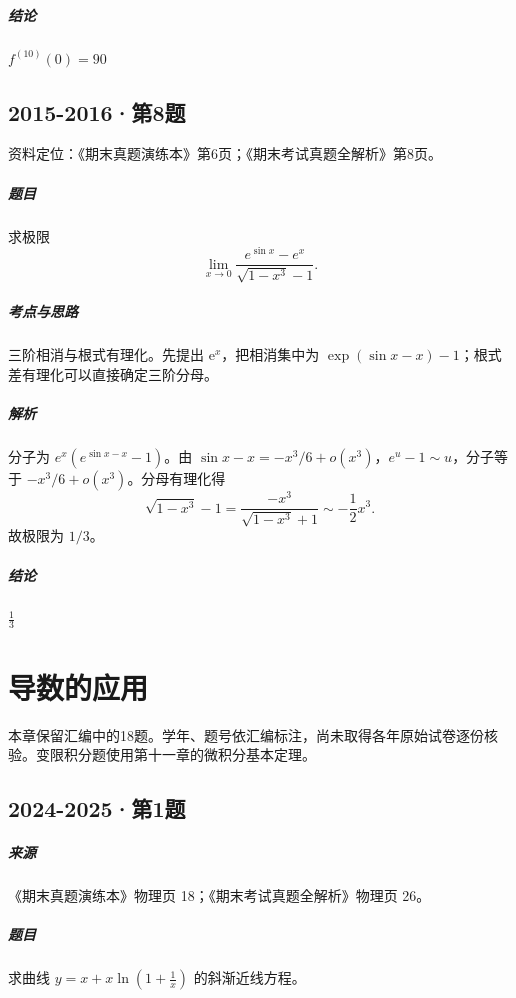 \documentclass[UTF8,fontset=fandol,12pt,oneside,openany]{ctexrep}
\newcommand{\ee}{\mathrm e}
\theoremstyle{definition}
\begin{document}
\paragraph{结论}
$f^{(10)}(0)=90$

\par\addvspace{18pt}\noindent\begin{minipage}{\linewidth}
\section{2015-2016·第8题}
\label{exam:08:q22}
资料定位：《期末真题演练本》第6页；《期末考试真题全解析》第8页。
\paragraph{题目}
求极限 \[\lim_{x\to0}\frac{e^{\sin x}-e^x}{\sqrt{1-x^3}-1}.\]
\end{minipage}\par
\paragraph{考点与思路}
三阶相消与根式有理化。先提出 $\ee^x$，把相消集中为 $\exp(\sin x-x)-1$；根式差有理化可以直接确定三阶分母。
\paragraph{解析}
分子为 $e^x(e^{\sin x-x}-1)$。由 $\sin x-x=-x^3/6+o(x^3)$，$e^u-1\sim u$，分子等于 $-x^3/6+o(x^3)$。分母有理化得 \[\sqrt{1-x^3}-1=\frac{-x^3}{\sqrt{1-x^3}+1}\sim-\frac12x^3.\]故极限为 $1/3$。
\paragraph{结论}
$\frac13$


\chapter{导数的应用}
\label{exam:09:chapter}
本章保留汇编中的18题。学年、题号依汇编标注，尚未取得各年原始试卷逐份核验。变限积分题使用第十一章的微积分基本定理。

\par\addvspace{18pt}\noindent\begin{minipage}{\linewidth}
\section{2024-2025·第1题}
\paragraph{来源}《期末真题演练本》物理页 18；《期末考试真题全解析》物理页 26。
\paragraph{题目}
求曲线 $y=x+x\ln(1+\frac1x)$ 的斜渐近线方程。
\end{minipage}\par
\end{document}

